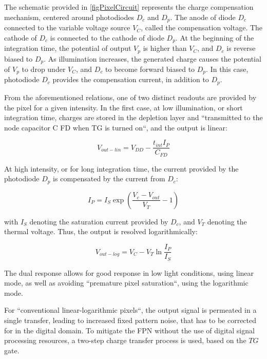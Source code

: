 The schematic provided in \ref{figPixelCircuit} represents the charge compensation mechanism, centered around 
photodiodes \(D_{c}\) and \(D_{p}\). The anode of diode \(D_{c}\) connected to the variable voltage source \(V_{C}\),
called the compensation voltage. The cathode of \(D_{c}\) is connected to the cathode of diode \(D_{p}\). At the beginning of
the integration time, the potential of output \(V_{p}\) is higher than \(V_{C}\), and \(D_{c}\) is reverse biased to \(D_{p}\).
As illumination increases, the generated charge causes the potential of \(V_{p}\) to drop under \(V_{C}\), and \(D_{c}\) to become 
forward biased to \(D_{p}\). In this case, photodiode \(D_{c}\) provides the compensation current, in addition to \(D_{p}\). \cite{withCompensation}

From the aforementioned relations, one of two distinct readouts are provided by the pixel for a given intensity. In the first case, 
at low illumination, or short integration time, charges are stored in the depletion layer and ``transmitted to the 
node capacitor C FD when TG is turned on``, and the output is linear:

\begin{equation}
    \label{eqLinOutput}
    V_{out-lin} = V_{DD} - \frac{t_{int}I_{P}}{C_{FD}}
\end{equation}

At high intensity, or for long integration time, the current provided by the photodiode \(D_{p}\) is compensated
by the current from \(D_{c}\):

\begin{equation}
    \label{eqIntLog}
    I_{P} = I_{S}\exp{(\frac{V_{c} - V_{out}}{V_{T}} - 1)}
\end{equation}

with \(I_{S}\) denoting the saturation current provided by \(D_{c}\), and \(V_{T}\) denoting the thermal voltage. 
Thus, the output is resolved logarithmically:

\begin{equation}
    \label{eqLogOutput}
    V_{out-log} = V_{C} - V_{T}\ln{\frac{I_{P}}{I_{S}}}
\end{equation}

The dual response allows for good response in low light conditions, using linear mode, as well as avoiding ``premature
pixel saturation``, using the logarithmic mode. \cite{withTable}

For ``conventional linear-logarithmic pixels``, the output signal is permeated in a single transfer, leading to increased
fixed pattern noise, that has to be corrected for in the digital domain. To mitigate the FPN without the use
of digital signal processing resources, a two-step charge transfer process is used, based on the \(TG\) gate.
\cite{withSteps}


